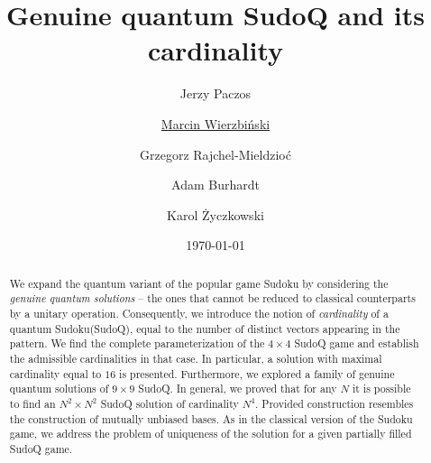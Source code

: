 \documentclass[aps,onecolumn,floatfix,superscriptaddress]{revtex4}
\begin{document}



\title{Genuine quantum SudoQ and its cardinality}

\author{Jerzy Paczos}
\author{\underline{Marcin Wierzbiński}}
\author{Grzegorz Rajchel-Mieldzio{\'c}}
\author{Adam Burhardt}
\author{Karol {\.Z}yczkowski}

\date{\today}

\begin{abstract}
\noindent
We expand the quantum variant of the popular game Sudoku by considering the \emph{genuine quantum solutions} – the ones that cannot be reduced to classical counterparts by a unitary operation. Consequently, we introduce the notion of \emph{cardinality} of a quantum Sudoku(SudoQ), equal to the number of distinct vectors appearing in the pattern.  We find the complete parameterization of the $4\times 4$ SudoQ game and establish the admissible cardinalities in that case. In particular, a solution with maximal cardinality equal to $16$ is presented. Furthermore, we explored a family of genuine quantum solutions of $9\times 9$ SudoQ. In general, we proved that for any $N$  it is possible to find an $N^2\times N^2$ SudoQ solution of cardinality $N^4$. Provided construction resembles the construction of mutually unbiased bases. As in the classical version of the Sudoku game, we address the problem of uniqueness of the solution for a given partially filled SudoQ game.
\end{abstract}
\end{document}
